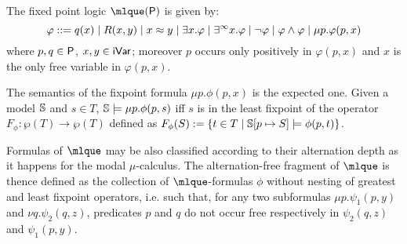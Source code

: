 \begin{definition}
The fixed point logic $\mlque(\prop)$ is given by:
$$
\varphi ::= q(x) \mid R(x,y) \mid x \approx y \mid \exists x.\varphi \mid \exists^\infty x.\varphi \mid \lnot\varphi \mid \varphi \land \varphi \mid \mu p.\varphi(p,x)
$$
where $p,q\in\mathsf{P}$, $x,y\in\mathsf{iVar}$; moreover $p$ occurs only positively in $\varphi(p,x)$ and $x$ is the only free variable in $\varphi(p,x)$.
\end{definition}



The semantics of the fixpoint formula $\mu p. \phi(p, x)$ is the expected one. Given a model $\mathbb{S}$ and $s \in T$,  $\mathbb{S} \models \mu p. \phi(p, s)$ iff $s$ is in the least fixpoint of the  operator $F_\phi:\wp(T)\to \wp(T)$ defined as $F_\phi(S) := \{t \in T \mid \mathbb{S}[p \mapsto S] \models \phi(p, t) \}$.

Formulas of $\mlque$ may be also classified according to their alternation depth as it happens for the modal $\mu$-calculus.
The alternation-free fragment of $\mlque$ is thence defined as the collection of $\mlque$-formulas $\phi$
without nesting of greatest and least fixpoint operators, i.e. such that, for any two subformulas $\mu p.\psi_1(p,y)$ and $\nu q. \psi_2(q,z)$, predicates $p$ and $q$ do not occur free respectively in $\psi_2(q,z)$ and $\psi_1(p,y)$.

